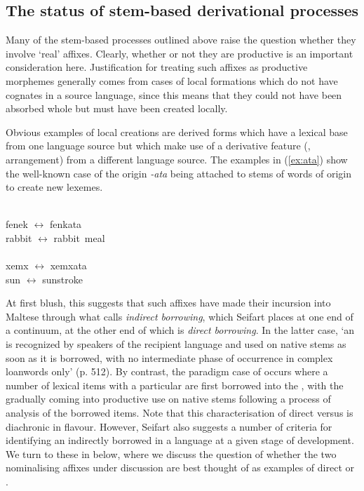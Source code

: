 \documentclass[output=paper]{LSP/langsci}
\begin{document}
\subsection{The status of stem-based derivational processes}
Many of the stem-based  processes outlined above raise the question whether they involve `real' affixes. Clearly, whether or not they are productive is an important consideration here. Justification for treating such affixes as productive morphemes generally comes from cases of local formations which do not have cognates in a source language, since this means that they could not have been absorbed whole but must have been created locally. 

Obvious examples of local creations are derived forms which have a lexical base from one language source but which make use of a derivative feature (,  arrangement) from a different language source. The examples in (\ref{ex:ata}) show the well-known case of the  origin  \textit{-ata} being attached to stems of words of  origin to create new lexemes. %

\ea\label{ex:ata}
\\
\gll fenek $\leftrightarrow$ fenkata\\
     rabbit $\leftrightarrow$ rabbit~meal\\\\
\gll xemx $\leftrightarrow$ xemxata\\
    sun $\leftrightarrow$ sunstroke\\
\z

At first blush, this suggests that such affixes have made their incursion into Maltese through what \citet{Seifart2015} calls \textit{indirect borrowing}, which Seifart places at one end of a continuum, at the other end of which is \textit{direct borrowing}. In the latter case, `an  is recognized by speakers of the recipient language \textellipsis and used on native stems as soon as it is borrowed, with no intermediate phase of occurrence in complex loanwords only' (p. 512). By contrast, the paradigm case of  occurs where a number of lexical items with a particular  are first borrowed into the , with the  gradually coming into productive use on native stems following a process of analysis of the borrowed items. Note that this characterisation of direct versus  is diachronic in flavour. However, Seifart also suggests a number of criteria for identifying an indirectly borrowed  in a language at a given stage of development. We turn to these in  below, where we discuss the question of whether the two nominalising affixes under discussion are best thought of as examples of direct or .
\end{document}
